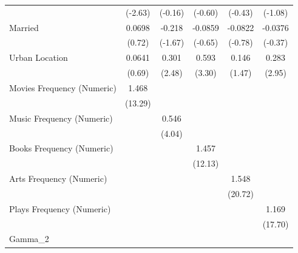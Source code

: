 {\begin{longtable}{l*{5}{c}}
                    &     (-2.63)       &     (-0.16)       &     (-0.60)       &     (-0.43)       &     (-1.08)       \\
Married             &      0.0698       &      -0.218\sym{*}&     -0.0859       &     -0.0822       &     -0.0376       \\
                    &      (0.72)       &     (-1.67)       &     (-0.65)       &     (-0.78)       &     (-0.37)       \\
Urban Location      &      0.0641       &       0.301\sym{*}&       0.593\sym{*}&       0.146       &       0.283\sym{*}\\
                    &      (0.69)       &      (2.48)       &      (3.30)       &      (1.47)       &      (2.95)       \\
Movies Frequency (Numeric)&       1.468\sym{*}&                   &                   &                   &                   \\
                    &     (13.29)       &                   &                   &                   &                   \\
Music Frequency (Numeric)&                   &       0.546\sym{*}&                   &                   &                   \\
                    &                   &      (4.04)       &                   &                   &                   \\
Books Frequency (Numeric)&                   &                   &       1.457\sym{*}&                   &                   \\
                    &                   &                   &     (12.13)       &                   &                   \\
Arts Frequency (Numeric)&                   &                   &                   &       1.548\sym{*}&                   \\
                    &                   &                   &                   &     (20.72)       &                   \\
Plays Frequency (Numeric)&                   &                   &                   &                   &       1.169\sym{*}\\
                    &                   &                   &                   &                   &     (17.70)       \\
\midrule
Gamma\_2             &                   &                   &                   &                   &                   \\

\end{longtable}}
